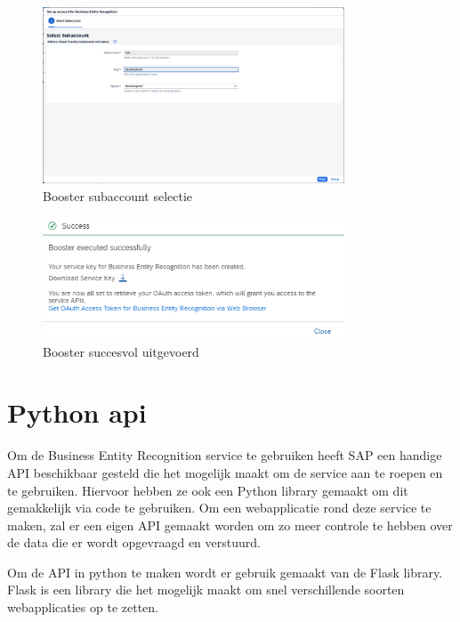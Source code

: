 \begin{figure}[H]
    \centering
    \includegraphics[width=0.8\textwidth]{./graphics/booster_subaccount.png}
    \caption{Booster subaccount selectie}
    \label{fig:booster-subaccount}
\end{figure}

\begin{figure}[H]
    \centering
    \includegraphics[width=0.8\textwidth]{./graphics/booster_succes.png}
    \caption{Booster succesvol uitgevoerd}
    \label{fig:booster-succes}
\end{figure}

\section{Python api}
\label{sec:python-api}

Om de Business Entity Recognition service te gebruiken heeft SAP een handige API beschikbaar gesteld die het mogelijk maakt om de service aan te roepen en te gebruiken. Hiervoor hebben ze ook een Python library gemaakt om dit gemakkelijk via code te gebruiken. Om een webapplicatie rond deze service te maken, zal er een eigen API gemaakt worden om zo meer controle te hebben over de data die er wordt opgevraagd en verstuurd.

Om de API in python te maken wordt er gebruik gemaakt van de Flask library. Flask is een library die het mogelijk maakt om snel verschillende soorten webapplicaties op te zetten. 

